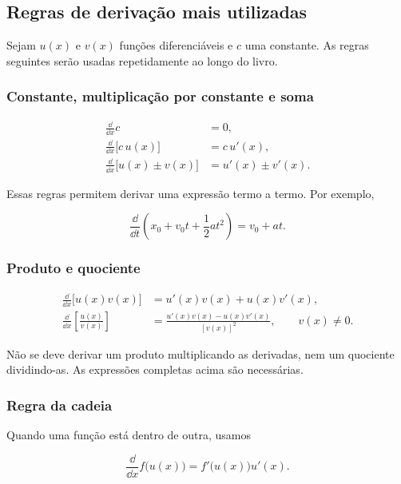 \subsection{Regras de derivação mais utilizadas}

Sejam $u(x)$ e $v(x)$ funções diferenciáveis e $c$ uma constante. As regras seguintes serão usadas repetidamente ao longo do livro.

\subsubsection*{Constante, multiplicação por constante e soma}

\begin{align}
  \frac{\dd}{\dd x}c &= 0,\\
  \frac{\dd}{\dd x}\bigl[c\,u(x)\bigr]
    &=c\,u'(x),\\
  \frac{\dd}{\dd x}\bigl[u(x)\pm v(x)\bigr]
    &=u'(x)\pm v'(x).
\end{align}

Essas regras permitem derivar uma expressão termo a termo. Por exemplo,

\begin{equation}
  \frac{\dd}{\dd t}\left(x_0+v_0t+\frac{1}{2}at^2\right)
  =v_0+at.
\end{equation}

\subsubsection*{Produto e quociente}

\begin{align}
  \frac{\dd}{\dd x}\bigl[u(x)v(x)\bigr]
    &=u'(x)v(x)+u(x)v'(x),\\
  \frac{\dd}{\dd x}\left[\frac{u(x)}{v(x)}\right]
    &=\frac{u'(x)v(x)-u(x)v'(x)}{[v(x)]^2},
    \qquad v(x)\neq0.
\end{align}

Não se deve derivar um produto multiplicando as derivadas, nem um quociente dividindo-as. As expressões completas acima são necessárias.

\subsubsection*{Regra da cadeia}

Quando uma função está dentro de outra, usamos

\begin{equation}
  \frac{\dd}{\dd x}f\bigl(u(x)\bigr)
  =f'\bigl(u(x)\bigr)u'(x).
\end{equation}

